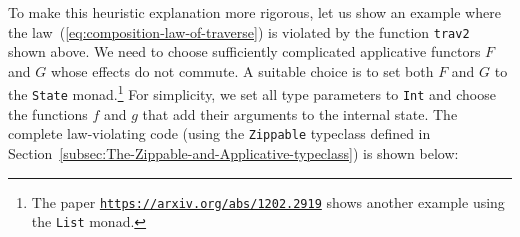 To make this heuristic explanation more rigorous, let us show an example
where the law~(\ref{eq:composition-law-of-traverse}) is violated
by the function \lstinline!trav2! shown above. We need to choose
sufficiently complicated applicative functors $F$ and $G$ whose
effects do not commute. A suitable choice is to set both $F$ and
$G$ to the \lstinline!State! monad.\footnote{The paper \texttt{\href{https://arxiv.org/abs/1202.2919}{https://arxiv.org/abs/1202.2919}}
shows another example using the \lstinline!List! monad.} For simplicity, we set all type parameters to \lstinline!Int! and
choose the functions $f$ and $g$ that add their arguments to the
internal state. The complete law-violating code (using the \lstinline!Zippable!
typeclass defined in Section~\ref{subsec:The-Zippable-and-Applicative-typeclass})
is shown below:

